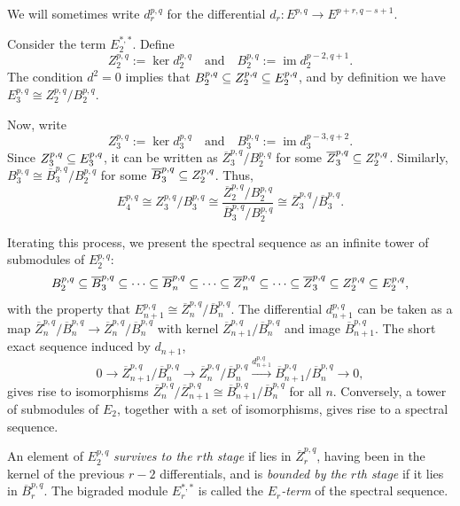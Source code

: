 \documentclass{MetricNotes2023}
\def\subq{\ensuremath\subseteq}
\DeclareMathOperator{\im}{im}
\begin{document}
We will sometimes write \(d^{p, q}_r\) for the differential \(d_r : E^{p, q}\to E^{p+r,q-s+1}\). 

Consider the term \(E_2^{*, *}\). Define 
\[Z_2^{p, q}:=\ker d_2^{p,q} \quad \text{and} \quad B_2^{p,q}:=\im d_2^{p-2,q+1}.\]
The condition \(d^2=0\) implies that \(B_2^{p,q}\subq Z_2^{p,q}\subq E_2^{p,q}\), and by definition we have \(E_3^{p,q}\cong Z^{p,q}_2/B_2^{p,q}\). 

Now, write 
\[Z_3^{p, q}:=\ker d_3^{p,q} \quad \text{and} \quad B_3^{p,q}:=\im d_3^{p-3,q+2}.\]
Since \(Z_3^{p,q}\subq E^{p,q}_3\), it can be written as \(\overline{Z}_3^{p,q}/B_2^{p,q}\) for some \(\overline{Z}_3^{p,q}\subq Z_2^{p,q}\). Similarly, \(B_3^{p,q}\cong \overline B_3^{p,q}/B_2^{p,q}\) for some \(\overline B_3^{p,q}\subq Z_2^{p,q}\). Thus,
\[E_4^{p,q}\cong Z_3^{p,q}/B_3^{p,q}\cong \frac{\overline Z_2^{p,q}/B_2^{p,q}}{\overline B_3^{p,q}/B_2^{p,q}}\cong \overline Z_3^{p,q}/\overline B_3^{p,q}.\]

Iterating this process, we present the spectral sequence as an infinite tower of submodules of \(E_2^{p,q}\):
\[B_2^{p,q}\subq \overline B_3^{p,q}\subq \cdots \subq \overline B_n^{p,q}\subq \cdots \subq \overline Z_n^{p,q}\subq \cdots \subq \overline Z_3^{p,q}\subq Z_2^{p,q}\subq E_2^{p,q},\]
with the property that \(E^{p,q}_{n+1}\cong \overline Z_n^{p,q}/\overline B_n^{p,q}\). The differential \(d_{n+1}^{p,q}\) can be taken as a map \(\overline Z^{p,q}_n/\overline B_n^{p,q}\to\overline Z_n^{p,q}/\overline B_n^{p,q}\) with kernel \(\overline Z_{n+1}^{p,q}/\overline B_n^{p,q}\) and image \(\overline B_{n+1}^{p,q}\). The short exact sequence induced by \(d_{n+1}\),
\[0 \to \overline Z^{p,q}_{n+1}/\overline B_n^{p,q}\to \overline Z_n^{p,q}/\overline B_n^{p,q} \xrightarrow{d_{n+1}^{p,q}} \overline B_{n+1}^{p,q}/\overline{B}_n^{p,q}\to 0,\]
gives rise to isomorphisms \(\overline{Z}_n^{p,q}/\overline{Z}_{n+1}^{p,q}\cong \overline{B}_{n+1}^{p,q}/\overline{B}_n ^{p,q}\) for all \(n\). Conversely, a tower of submodules of \(E_2\), together with a set of isomorphisms, gives rise to a spectral sequence. 

\begin{definition}
An element of \(E_2^{p,q}\) \textit{survives to the \(r\)th stage} if lies in \(\overline{Z}_r^{p,q}\), having been in the kernel of the previous \(r-2\) differentials, and is \textit{bounded by the \(r\)th stage} if it lies in \(\overline{B}_r^{p,q}\). The bigraded module \(E_r^{*,*}\) is called the \textit{\(E_r\)-term} of the spectral sequence. 
\end{definition}
\end{document}
